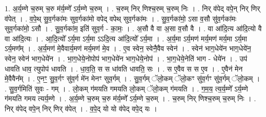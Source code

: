 \documentclass[17pt]{extarticle}
\begin{document}
1. अ॒र्य॒म्णे च॒रुम् च॒रु म॑र्य॒म्णे᳚ ऽर्य॒म्णे च॒रुम् । . च॒रुम् निर् णिश्च॒रुम् च॒रुम् निः । . निर् व॑पेद् वपे॒न् निर् णिर् व॑पेत् । . व॒पे॒थ् सु॒व॒र्गका॑मः सुव॒र्गका॑मो वपेद् वपेथ् सुव॒र्गका॑मः । . सु॒व॒र्गका॑मो॒ ऽसा व॒सौ सु॑व॒र्गका॑मः सुव॒र्गका॑मो॒ ऽसौ । . सु॒व॒र्गका॑म॒ इति॑ सुव॒र्ग - का॒मः॒ । . अ॒सौ वै वा अ॒सा व॒सौ वै । . वा आ॑दि॒त्य आ॑दि॒त्यो वै वा आ॑दि॒त्यः । . आ॒दि॒त्यो᳚ ऽर्य॒मा ऽर्य॒मा ऽऽदि॒त्य आ॑दि॒त्यो᳚ ऽर्य॒मा । . अ॒र्य॒मा ऽर्य॒मण॑ मर्य॒मण॑ मर्य॒मा ऽर्य॒मा ऽर्य॒मण᳚म् । . अ॒र्य॒मण॑ मे॒वैवार्य॒मण॑ मर्य॒मण॑ मे॒व । . ए॒व स्वेन॒ स्वेनै॒वैव स्वेन॑ । . स्वेन॑ भाग॒धेये॑न भाग॒धेये॑न॒ स्वेन॒ स्वेन॑ भाग॒धेये॑न । . भा॒ग॒धेये॒नोपोप॑ भाग॒धेये॑न भाग॒धेये॒नोप॑ । . भा॒ग॒धेये॒नेति॑ भाग - धेये॑न । . उप॑ धावति धाव॒ त्युपोप॑ धावति । . धा॒व॒ति॒ स स धा॑वति धावति॒ सः । . स ए॒वैव स स ए॒व । . ए॒वैन॑ मेन मे॒वैवैन᳚म् । . ए॒नꣳ॒॒ सु॒व॒र्गꣳ सु॑व॒र्ग मे॑न मेनꣳ सुव॒र्गम् । . सु॒व॒र्गम् ॅलो॒कम् ॅलो॒कꣳ सु॑व॒र्गꣳ सु॑व॒र्गम् ॅलो॒कम् । . सु॒व॒र्गमिति॑ सुवः - गम् । . लो॒कम् ग॑मयति गमयति लो॒कम् ॅलो॒कम् ग॑मयति । . ग॒म॒य॒ त्य॒र्य॒म्णे᳚ ऽर्य॒म्णे ग॑मयति गमय त्यर्य॒म्णे । . अ॒र्य॒म्णे च॒रुम् च॒रु म॑र्य॒म्णे᳚ ऽर्य॒म्णे च॒रुम् । . च॒रुम् निर् णिश्च॒रुम् च॒रुम् निः । . निर् व॑पेद् वपे॒न् निर् णिर् व॑पेत् । . व॒पे॒द् यो यो व॑पेद् वपे॒द् यः । \newline
\end{document}
